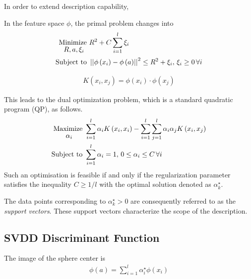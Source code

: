 \documentclass[journal,transmag,times]{IEEEtran}
\begin{document}
In order to extend description capability,

In the feature space $\phi$, the primal problem changes into
\begin{subequations}\label{eq:svdd_primal}
\begin{align}
\underset{
	\begin{array}{c}
		 R, a, \xi_i
	\end{array}}{\text{Minimize }} & R^2 + C \sum_{i=1}^l \xi_i \\
\text{Subject to } & \left|\left| \phi \left(x_i\right) - \phi \left( a \right) \right|\right|^2 \le R^2 + \xi_i, \thinspace \xi_i \ge 0 \thinspace \forall i
\end{align}
\end{subequations}

\begin{align}
K \left( x_i, x_j \right) = \phi \left( x_i \right) \cdot \phi \left( x_j \right)
\end{align}

This leads to the dual optimization problem, which is a standard quadratic program (QP), as follows.
\begin{subequations}\label{eq:svdd_dual}
\begin{align}
\underset{
	\begin{array}{c}
		 \alpha_i
	\end{array}}{\text{Maximize }} & \sum_{i=1}^l \alpha_i K \left( x_i, x_i \right) - \sum_{i=1}^l \sum_{j=1}^l \alpha_i \alpha_j K \left( x_i, x_j \right)\\
\text{Subject to } & \sum_{i=1}^l \alpha_i = 1, \thinspace 0 \le \alpha_i \le C \thinspace \forall i
\end{align}
\end{subequations}
Such an optimisation is feasible if and only if the regularization parameter satisfies the inequality $C \ge 1{}/l$ with the optimal solution denoted as $\alpha^\star_k$. 

The data points corresponding to $\alpha^\star_k > 0$ are consequently referred to as the \emph{support vectors}. These support vectors characterize the scope of the description.

\subsection{SVDD Discriminant Function}

The image of the sphere center is
\begin{align}
\phi \left( a \right) = \sum_{i=1}^l \alpha^\star_i \phi \left( x_i \right)
\end{align}
\end{document}
